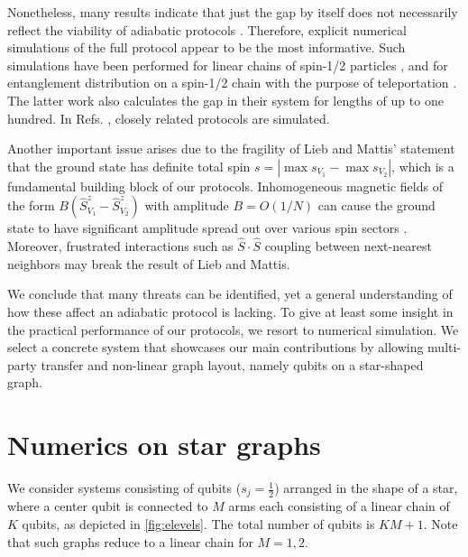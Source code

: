 Nonetheless, many results indicate that just the gap by itself does not necessarily reflect the viability of adiabatic protocols \cite{Polkovnikov2008, Lychkovskiy2017}. Therefore, explicit numerical simulations of the full protocol appear to be the most informative. Such simulations have been performed for linear chains of spin-1/2 particles \cite{Oh2013,Agundez2017}, and for entanglement distribution on a spin-1/2 chain with the purpose of teleportation \cite{CamposVenuti2007}. The latter work also calculates the gap in their system for lengths of up to one hundred. In Refs. \cite{Eckert2007,Farooq2015}, closely related protocols are simulated. 

Another important issue arises due to the fragility of Lieb and Mattis' statement that the ground state has definite total spin $s = |\max s_{V_1} - \max s_{V_2}|$, which is a fundamental building block of our protocols. Inhomogeneous magnetic fields of the form $B (\hat{S}^z_{V_1} - \hat{S}^z_{V_2})$ with amplitude $B = O(1/N)$ can cause the ground state to have significant amplitude spread out over various spin sectors \cite{Kaiser1989, vanWezel2007}. Moreover, frustrated interactions such as $\hat{S} \cdot \hat{S}$ coupling between next-nearest neighbors may break the result of Lieb and Mattis. 

We conclude that many threats can be identified, yet a general understanding of how these affect an adiabatic protocol is lacking. To give at least some insight in the practical performance of our protocols, we resort to numerical simulation. We select a concrete system that showcases our main contributions by allowing multi-party transfer and non-linear graph layout, namely qubits on a star-shaped graph. 


\section{Numerics on star graphs}
We consider systems consisting of qubits ($s_j = \frac{1}{2}$) arranged in the shape of a star, where a center qubit is connected to $M$ arms each consisting of a linear chain of $K$ qubits, as depicted in \cref{fig:elevels}. The total number of qubits is $KM+1$. Note that such graphs reduce to a linear chain for $M=1,2$. 

